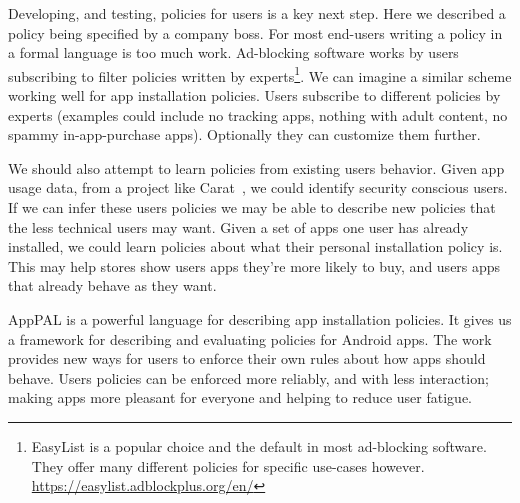 \documentclass[]{llncs}
\begin{document}
Developing, and testing, policies for users is a key next step.
Here we described a policy being specified by a company boss.
For most end-users writing a policy in a formal language is too much work.
Ad-blocking software works by users subscribing to filter policies written by experts\footnote{EasyList is a popular choice and the default in most ad-blocking software. They offer many different policies for specific use-cases however. \url{https://easylist.adblockplus.org/en/}}.
We can imagine a similar scheme working well for app installation policies.
Users subscribe to different policies by experts (examples could include no tracking apps, nothing with adult content, no spammy in-app-purchase apps).
Optionally they can customize them further.

We should also attempt to learn policies from existing users behavior.
Given app usage data, from a project like Carat~\cite{Oliner:2013ht}, we could identify security conscious users.
If we can infer these users policies we may be able to describe new policies that the less technical users may want.
Given a set of apps one user has already installed, we could learn policies about what their personal installation policy is.
This may help stores show users apps they're more likely to buy, and users apps that already behave as they want.

AppPAL is a powerful language for describing app installation policies.
It gives us a framework for describing and evaluating policies for Android apps.
The work provides new ways for users to enforce their own rules about how apps should behave.
Users policies can be enforced more reliably, and with less interaction;
making apps more pleasant for everyone and helping to reduce user fatigue.



\end{document}
